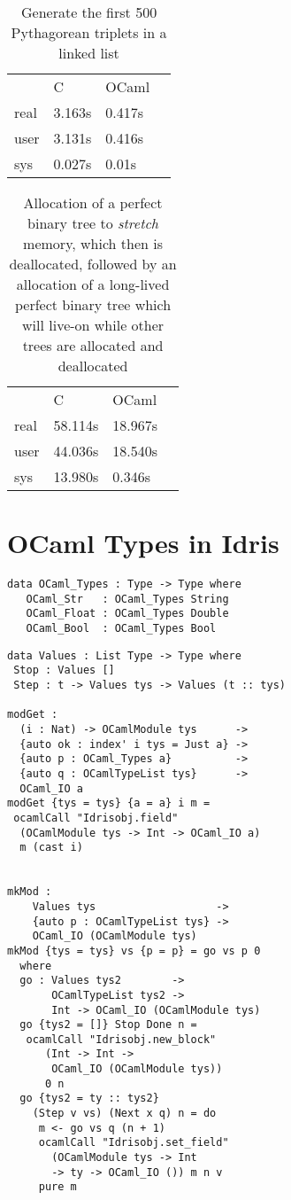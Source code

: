 \documentclass[a4paper,twocolumn]{article}
\begin{document}
\begin{table}
    \centering
    \caption{Generate the first 500 Pythagorean triplets in a linked list}
    \begin{tabular}{llll}\label{tab:pythagtab}
             & C      & OCaml  & \\
        real & 3.163s & 0.417s & \\
        user & 3.131s & 0.416s & \\
        sys  & 0.027s & 0.01s  &
    \end{tabular}
\end{table}


\begin{table}
    \centering
    \caption{Allocation of a perfect binary tree to \emph{stretch} memory, which then is deallocated, followed by an allocation of a long-lived perfect binary tree which will live-on while other trees are allocated and deallocated}
    \begin{tabular}{llll}\label{tab:bintreetab}
             & C       & OCaml   & \\
        real & 58.114s & 18.967s & \\
        user & 44.036s & 18.540s & \\
        sys  & 13.980s & 0.346s  &
    \end{tabular}
\end{table}





\section{OCaml Types in Idris}

\begin{lstlisting}
data OCaml_Types : Type -> Type where
   OCaml_Str   : OCaml_Types String
   OCaml_Float : OCaml_Types Double
   OCaml_Bool  : OCaml_Types Bool
\end{lstlisting}


\begin{lstlisting}
data Values : List Type -> Type where
 Stop : Values []
 Step : t -> Values tys -> Values (t :: tys)

modGet :
  (i : Nat) -> OCamlModule tys      ->
  {auto ok : index' i tys = Just a} ->
  {auto p : OCaml_Types a}          -> 
  {auto q : OCamlTypeList tys}      ->
  OCaml_IO a
modGet {tys = tys} {a = a} i m = 
 ocamlCall "Idrisobj.field" 
  (OCamlModule tys -> Int -> OCaml_IO a) 
  m (cast i)


mkMod : 
    Values tys                   -> 
    {auto p : OCamlTypeList tys} ->
    OCaml_IO (OCamlModule tys)
mkMod {tys = tys} vs {p = p} = go vs p 0 
  where
  go : Values tys2        ->
       OCamlTypeList tys2 ->
       Int -> OCaml_IO (OCamlModule tys)
  go {tys2 = []} Stop Done n =
   ocamlCall "Idrisobj.new_block" 
      (Int -> Int -> 
       OCaml_IO (OCamlModule tys)) 
      0 n
  go {tys2 = ty :: tys2} 
    (Step v vs) (Next x q) n = do
     m <- go vs q (n + 1)
     ocamlCall "Idrisobj.set_field" 
       (OCamlModule tys -> Int 
       -> ty -> OCaml_IO ()) m n v
     pure m 
\end{lstlisting}
\end{document}
